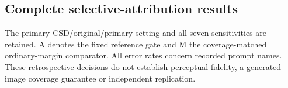 \clearpage\subsection{Complete selective-attribution results}
\label{app:selective-results}
The primary CSD/original/primary setting and all seven sensitivities are retained. A denotes the fixed reference gate and M the coverage-matched ordinary-margin comparator. All error rates concern recorded prompt names. These retrospective decisions do not establish perceptual fidelity, a generated-image coverage guarantee or independent replication.
